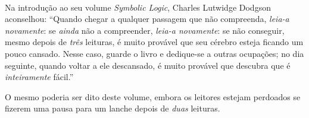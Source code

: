 \clearpage
\thispagestyle{plain}
\onecolumn
\
\vfill

\parbox{3 in}{
Na introdução ao seu volume \emph{Symbolic Logic}, Charles Lutwidge Dodgson aconselhou: \textquotedblleft Quando chegar a qualquer passagem que não compreenda, \emph{leia-a novamente}: se \emph{ainda} não a compreender, \emph{leia-a novamente}: se não conseguir, mesmo depois de \emph{três} leituras, é muito provável que seu cérebro esteja ficando um pouco cansado. Nesse caso, guarde o livro e dedique-se a outras ocupações; no dia seguinte, quando voltar a ele descansado, é muito provável que descubra que é \emph{inteiramente} fácil.\textquotedblright{}

\medskip

O mesmo poderia ser dito deste volume, embora os leitores estejam perdoados se fizerem uma pausa para um lanche depois de \emph{duas} leituras.
}

\vfill

\parbox{3 in}{

}
\vfill

